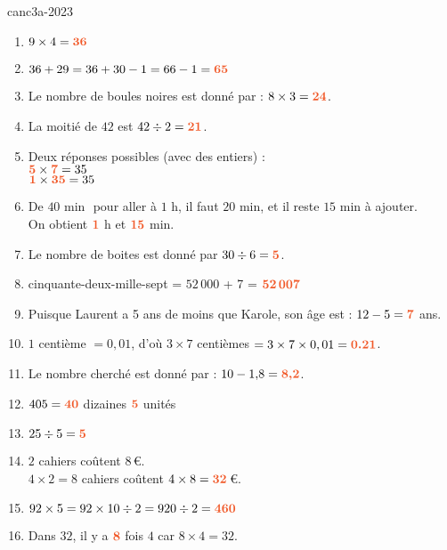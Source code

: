 \begin{EXO}{}{canc3a-2023}
    
\begin{enumerate}[itemsep=1em, label=\arabic*)]
\item $9 \times 4={\color[HTML]{f15929}\boldsymbol{36}}$
\item $36+29=36+30-1=66-1={\color[HTML]{f15929}\boldsymbol{65}}$
\item Le nombre de boules noires est donné par : $8\times 3={\color[HTML]{f15929}\boldsymbol{24}}$.
\item La moitié de $42$ est $42\div 2={\color[HTML]{f15929}\boldsymbol{21}}$.
\item Deux réponses possibles (avec des entiers) : \\         ${\color[HTML]{f15929}\boldsymbol{5}}\times {\color[HTML]{f15929}\boldsymbol{7}}=35$\\         ${\color[HTML]{f15929}\boldsymbol{1}}\times {\color[HTML]{f15929}\boldsymbol{35}}=35$ 
\item De $40 \text{ min }$ pour aller à $1$ h, il faut $20$ min, et il reste $15$ min à ajouter.\\         On obtient  ${\color[HTML]{f15929}\boldsymbol{1}}$ h et ${\color[HTML]{f15929}\boldsymbol{15}}$ min.
\item Le nombre de boites est donné par $30\div 6={\color[HTML]{f15929}\boldsymbol{5}}$.
\item cinquante-deux-mille-sept = $52\,000$ + 7 = ${\color[HTML]{f15929}\boldsymbol{52\,007}}$ 
\item Puisque Laurent a 5 ans de moins que Karole, son âge est  : $12-5={\color[HTML]{f15929}\boldsymbol{7}}$ {\color[HTML]{f15929}ans}. 
\item $1$ centième $=0,01$, d'où $3\times 7$ centièmes $=3\times 7\times 0,01={\color[HTML]{f15929}\boldsymbol{0.21}}$.
\item Le nombre cherché est donné par : $10-1{,}8={\color[HTML]{f15929}\boldsymbol{8{,}2}}$.
\item $405 = {\color[HTML]{f15929}\boldsymbol{40}}$ dizaines ${\color[HTML]{f15929}\boldsymbol{5}}$ unités
\item $25\div 5={\color[HTML]{f15929}\boldsymbol{5}}$
\item $2$ cahiers coûtent $8$\,\euro{}.\\ $4\times2=8$ cahiers coûtent $4\times8={\color[HTML]{f15929}\boldsymbol{32}}$\,\euro{}.
\item $92\times 5=92\times 10 \div 2=920\div 2={\color[HTML]{f15929}\boldsymbol{460}}$
\item Dans $32$, il y a ${\color[HTML]{f15929}\boldsymbol{8}}$ fois $4$ car $8\times 4=32$.

\end{enumerate}
\end{EXO}
